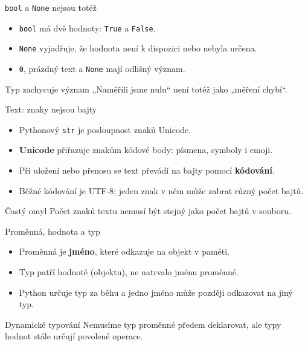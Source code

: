 \documentclass[aspectratio=169]{beamer}
\newcommand{\term}[1]{\textcolor{CodeBlue}{\textbf{#1}}}
\begin{document}
\begin{frame}{\texttt{bool} a \texttt{None} nejsou totéž}
  \begin{itemize}
    \item \texttt{bool} má dvě hodnoty: \texttt{True} a \texttt{False}.
    \item \texttt{None} vyjadřuje, že hodnota není k dispozici nebo nebyla určena.
    \item \texttt{0}, prázdný text a \texttt{None} mají odlišný význam.
  \end{itemize}
  \begin{block}{Typ zachycuje význam}
    „Naměřili jsme nulu“ není totéž jako „měření chybí“.
  \end{block}
\end{frame}

\begin{frame}{Text: znaky nejsou bajty}
  \begin{itemize}
    \item Pythonový \texttt{str} je posloupnost znaků Unicode.
    \item \term{Unicode} přiřazuje znakům kódové body: písmena, symboly i emoji.
    \item Při uložení nebo přenosu se text převádí na bajty pomocí \term{kódování}.
    \item Běžné kódování je UTF-8; jeden znak v něm může zabrat různý počet bajtů.
  \end{itemize}
  \begin{alertblock}{Častý omyl}
    Počet znaků textu nemusí být stejný jako počet bajtů v souboru.
  \end{alertblock}
\end{frame}

\begin{frame}{Proměnná, hodnota a typ}
  \begin{itemize}
    \item Proměnná je \term{jméno}, které odkazuje na objekt v paměti.
    \item Typ patří hodnotě (objektu), ne natrvalo jménu proměnné.
    \item Python určuje typ za běhu a jedno jméno může později odkazovat na jiný typ.
  \end{itemize}
  \begin{block}{Dynamické typování}
    Nemusíme typ proměnné předem deklarovat, ale typy hodnot stále určují povolené operace.
  \end{block}
\end{frame}
\end{document}
